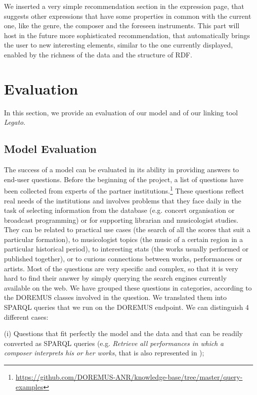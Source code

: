 We inserted a very simple recommendation section in the expression page, that suggests other expressions that have some properties in common with the current one, like the genre, the composer and the foreseen instruments. This part will host in the future more sophisticated recommendation, that automatically brings the user to new interesting elements, similar to the one currently displayed, enabled by the richness of the data and the structure of RDF.


\section{Evaluation}
\label{sec:evaluation}
In this section, we provide an evaluation of our model and of our linking tool {\it Legato}.

\subsection{Model Evaluation}
The success of a model can be evaluated in its ability in providing answers to end-user questions. Before the beginning of the project, a list of questions have been collected from experts of the partner institutions.\footnote{\url{https://github.com/DOREMUS-ANR/knowledge-base/tree/master/query-examples}} These questions reflect real needs of the institutions and involves problems that they face daily in the task of selecting information from the database (e.g. concert organisation or broadcast programming) or for supporting librarian and musicologist studies. They can be related to practical use cases (the search of all the scores that suit a particular formation), to musicologist topics (the music of a certain region in a particular historical period), to interesting stats (the works usually performed or published together), or to curious connections between works, performances or artists. Most of the questions are very specific and complex, so that it is very hard to find their answer by simply querying the search engines currently available on the web. We have grouped these questions in categories, according to the DOREMUS classes involved in the question. We translated them into SPARQL queries that we run on the DOREMUS endpoint. We can distinguish 4 different cases:

(i) Questions that fit perfectly the model and the data and that can be readily converted as SPARQL queries (e.g. \textit{Retrieve all performances in which a composer interprets his or her works}, that is also represented in );

